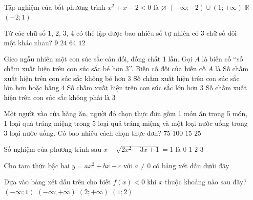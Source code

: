 \begin{ex}%
	Tập nghiệm của bất phương trình $x^2+x-2< 0$ là
	\choice
	{$\varnothing$}
	{$(-\infty;-2) \cup(1;+\infty)$}
	{$\mathbb{R}$}
	{\True$(-2; 1)$}
	\loigiai{}
\end{ex}
\begin{ex}%
	Từ các chữ số $1$, $2$, $3$, $4$ có thể lập được bao nhiêu số tự nhiên có $3$ chữ số đôi một khác nhau?
	\choice
	{$9$}
	{\True$24$}
	{$64$}
	{$12$}
	\loigiai{}
\end{ex}
\begin{ex}%
	Gieo ngẫu nhiên một con súc sắc cân đối, đồng chất 1 lần. Gọi $A$ là biến cố \lq\lq số chấm xuất hiện trên con súc sắc bé hơn 3\rq\rq. Biến cố đối của biến cố $A$ là
	\choice
	{\True Số chấm xuất hiện trên con súc sắc không bé hơn $3$}
	{Số chấm xuất hiện trên con súc sắc lớn hơn hoặc bằng $4$}
	{Số chấm xuất hiện trên con súc sắc lớn hơn $3$}
	{Số chấm xuất hiện trên con súc sắc không phải là $3$}
	\loigiai{}
\end{ex}
\begin{ex}%
	Một người vào cửa hàng ăn, người đó chọn thực đơn gồm 1 món ăn trong 5 món, 1 loại quả tráng miệng trong 5 loại quả tráng miệng và một loại nước uống trong 3 loại nước uống. Có bao nhiêu cách chọn thực đơn?
	\choice
	{\True$75$}
	{$100$}
	{$15$}
	{$25$}
	\loigiai{}
\end{ex}
\begin{ex}%
	Số nghiệm của phương trình sau $x-\sqrt{2x^2-3x+1}=1$ là
	\choice
	{$0$}
	{\True$1$}
	{$2$}
	{$3$}
	\loigiai{}
\end{ex}
\begin{ex}%
	Cho tam thức bậc hai $y=a x^2+b x+c$ với $a \neq 0$ có bảng xét dấu dưới đây
	\begin{center}
	\end{center}
	Dựa vào bảng xét dấu trên cho biết $f(x) < 0$ khi $x$ thuộc khoảng nào sau đây?
	\choice
	{$(-\infty; 1)$}
	{$(-\infty;+\infty)$}
	{$(2;+\infty)$}
	{\True$(1; 2)$}
	\loigiai{}
\end{ex}

